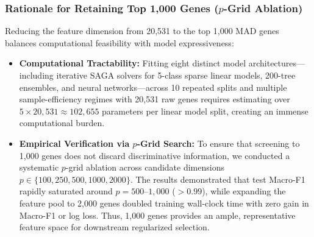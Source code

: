 \documentclass[11pt,a4paper]{article}
\begin{document}
\subsubsection{Rationale for Retaining Top 1,000 Genes (\texorpdfstring{$p$}{p}-Grid Ablation)}
Reducing the feature dimension from 20,531 to the top 1,000 MAD genes balances computational feasibility with model expressiveness:
\begin{itemize}\itemsep=1.5pt
    \item \textbf{Computational Tractability:} Fitting eight distinct model architectures—including iterative SAGA solvers for 5-class sparse linear models, 200-tree ensembles, and neural networks—across 10 repeated splits and multiple sample-efficiency regimes with 20,531 raw genes requires estimating over $5 \times 20{,}531 \approx 102{,}655$ parameters per linear model split, creating an immense computational burden.
    \item \textbf{Empirical Verification via $p$-Grid Search:} To ensure that screening to 1,000 genes does not discard discriminative information, we conducted a systematic $p$-grid ablation across candidate dimensions $p \in \{100, 250, 500, 1000, 2000\}$. The results demonstrated that test Macro-F1 rapidly saturated around $p = 500\text{--}1{,}000$ ($>0.99$), while expanding the feature pool to 2,000 genes doubled training wall-clock time with zero gain in Macro-F1 or log loss. Thus, 1,000 genes provides an ample, representative feature space for downstream regularized selection.
\end{itemize}
\end{document}
